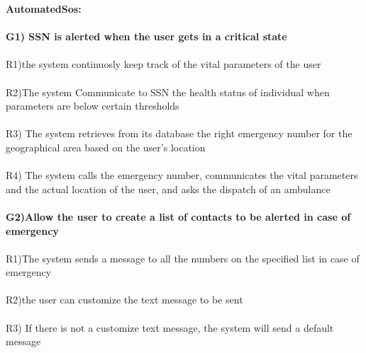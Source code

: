 \textbf{AutomatedSos:} \\ \\ 
\textbf{G1) SSN is alerted when the user gets in a critical state} \\ \\
R1)the system continuosly keep track of the vital parameters of the user \\ \\
R2)The system Communicate to SSN the health status of individual when parameters are below certain thresholds \\ \\
R3) The system retrieves from its database the right emergency number for the geographical area based on the user’s location \\ \\

R4) The system calls the emergency number, communicates the vital parameters and the actual location of the user, and asks the dispatch of an ambulance \\ \\

\textbf{G2)Allow the user to create a list of contacts to be alerted  in case of emergency} \\ \\

R1)The system sends a message to all the numbers on the specified list in case of emergency \\ \\
R2)the user can customize the  text message to be sent \\ \\
R3) If there is not a customize text message, the system will send a default message \\ \\

